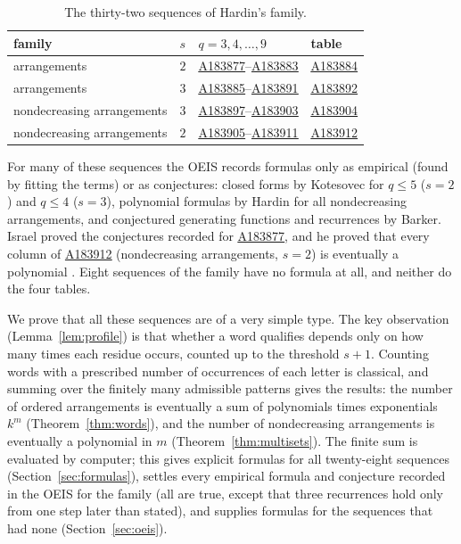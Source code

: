 \documentclass[12pt,reqno]{article}
\newcommand{\seqnum}[1]{\href{https://oeis.org/#1}{\rm \underline{#1}}}
\begin{document}
\begin{table}[ht]
\begin{center}
\begin{tabular}{llll}
\hline
family & $s$ & $q = 3, 4, \ldots, 9$ & table \\
\hline
arrangements & $2$ & \seqnum{A183877}--\seqnum{A183883} & \seqnum{A183884} \\
arrangements & $3$ & \seqnum{A183885}--\seqnum{A183891} & \seqnum{A183892} \\
nondecreasing arrangements & $3$ & \seqnum{A183897}--\seqnum{A183903} & \seqnum{A183904} \\
nondecreasing arrangements & $2$ & \seqnum{A183905}--\seqnum{A183911} & \seqnum{A183912} \\
\hline
\end{tabular}
\end{center}
\caption{The thirty-two sequences of Hardin's family.}\label{tab:family}
\end{table}

For many of these sequences the OEIS records formulas only as empirical
(found by fitting the terms) or as conjectures: closed forms by Kotesovec
for $q \le 5$ ($s = 2$) and $q \le 4$ ($s = 3$), polynomial formulas by Hardin
for all nondecreasing arrangements, and conjectured generating functions and
recurrences by Barker. Israel proved the conjectures recorded for
\seqnum{A183877}, and he proved that every column of \seqnum{A183912}
(nondecreasing arrangements, $s = 2$) is eventually a polynomial
\cite{israel}. Eight sequences of the family have no formula at all, and
neither do the four tables.

We prove that all these sequences are of a very simple type. The key
observation (Lemma~\ref{lem:profile}) is that whether a word qualifies
depends only on how many times each residue occurs, counted up to the
threshold $s+1$. Counting words with a prescribed number of occurrences of
each letter is classical, and summing over the finitely many admissible
patterns gives the results: the number of ordered arrangements is
eventually a sum of polynomials times exponentials $k^m$
(Theorem~\ref{thm:words}), and the number of nondecreasing arrangements is
eventually a polynomial in $m$ (Theorem~\ref{thm:multisets}). The
finite sum is evaluated by computer; this gives explicit formulas for all
twenty-eight sequences (Section~\ref{sec:formulas}), settles every empirical formula and conjecture
recorded in the OEIS for the family (all are true, except that three
recurrences hold only from one step later than stated), and supplies formulas
for the sequences that had none (Section~\ref{sec:oeis}).
\end{document}
